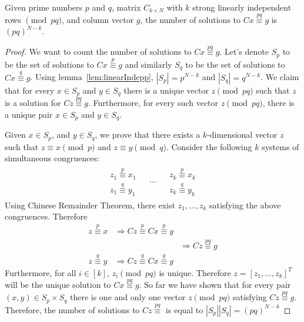 \documentclass[anon,12pt]{colt2016}
\newcommand{\transp}[1]{#1^T}
\begin{document}
\begin{lemma}
\label{lem:indeppq}
Given prime numbers $p$ and $q$, matrix $C_{k\times N}$ with $k$ strong linearly independent rows $\pmod{pq}$, and column vector ${g}$, the number of solutions to $C{x} \overset{pq}{\equiv} {g}$ is $(pq)^{N-k}$.
\end{lemma}

\begin{proof}
	

We want to count the number of solutions to $C{x} \overset{pq}{\equiv}{g}$. Let's denote $S_p$ to be the set of solutions to $Cx\overset{p}{\equiv}g$ and similarly $S_q$ to be the set of solutions to $Cx\overset{q}{\equiv}g$. Using lemma~\ref{lem:linearIndepp}, $|S_p|=p^{N-k}$ and $|S_q|=q^{N-k}$. We claim that for every $x\in S_p$ and $y \in S_q$ there is a unique vector $z\pmod{pq}$ such that $z$ is a solution for $Cz\overset{pq}{\equiv}g$. Furthermore, for every such vector $z\pmod{pq}$, there is a unique pair $x\in S_p$ and $y\in S_q$. 
 
Given $x\in S_p$, and $y\in S_q$, we prove that there exists a $k$-dimensional vector ${z}$ such that ${z}\equiv{x}\pmod{p}$ and ${z}\equiv{y}\pmod{q}$. Consider the following $k$ systems of simultaneous congruences:
$$
\begin{array}{lcr}
\begin{array}{l}
{z}_1\overset{p}{\equiv} {x}_1\\
{z}_1\overset{q}{\equiv} {y}_1
\end{array} &
\begin{array}{c}
\ldots
\end{array}&
\begin{array}{r}
{z}_k\overset{p}{\equiv} {x}_k\\
{z}_k\overset{q}{\equiv} {y}_k
\end{array}
	
\end{array}
$$
Using Chinese Remainder Theorem, there exist ${z}_1,\ldots,{z}_k$ satisfying the above congruences. Therefore
$$
\begin{array}{lrr}
z \overset{p}{\equiv} x  & \Rightarrow Cz \overset{p}{\equiv} Cx\overset{p}{\equiv} g &\\
& & \Rightarrow Cz \overset{pq}{\equiv} g \\

z \overset{q}{\equiv} y  &\Rightarrow Cz \overset{q}{\equiv} Cx\overset{q}{\equiv} g &
\end{array}
$$
 Furthermore, for all $i\in[k]$, ${z}_i\pmod{pq}$ is unique. Therefore $z=[z_1,\ldots,z_k]\transp{}$ will be the unique solution to $Cx\overset{pq}{\equiv}g$. So far we have shown that for every pair $(x,y)\in S_p\times S_q$ there is one and only one vector $z\pmod{pq}$ satisfying $Cz\overset{pq}{\equiv}g$. Therefore, the number of solutions to $Cz\overset{pq}{\equiv}$ is equal to $|S_p||S_q|=(pq)^{N-k}$
 
\end{proof}
\end{document}
